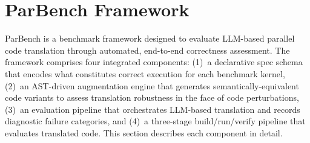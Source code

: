 %
%

\section{ParBench Framework}
\label{sec:framework}

ParBench is a benchmark framework designed to evaluate LLM-based parallel code translation through automated, end-to-end correctness assessment. The framework comprises four integrated components: (1)~a declarative spec schema that encodes what constitutes correct execution for each benchmark kernel, (2)~an AST-driven augmentation engine that generates semantically-equivalent code variants to assess translation robustness in the face of code perturbations, (3)~an evaluation pipeline that orchestrates LLM-based translation and records diagnostic failure categories, and (4)~a three-stage build/run/verify pipeline that evaluates translated code. This section describes each component in detail.

